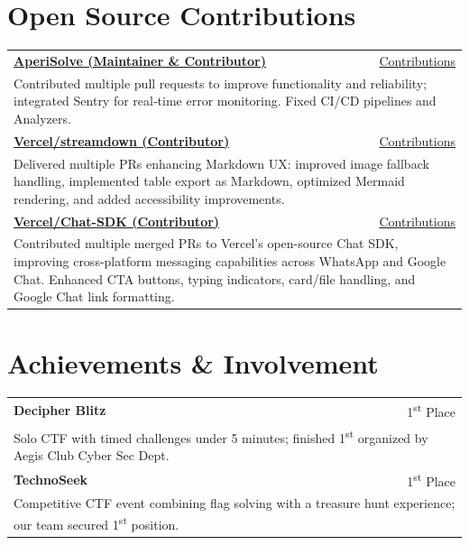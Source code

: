 \documentclass[letterpaper,11pt]{article}
\begin{document}
\section*{Open Source Contributions}
\begin{tabularx}{\textwidth}{X r}

\textbf{\href{https://github.com/Zeecka/AperiSolve}{AperiSolve (Maintainer \& Contributor)}} & \href{https://github.com/Zeecka/AperiSolve/issues?q=is\%3Apr\%20state\%3Aclosed\%20author\%3Aaradhyacp}{Contributions} \\
\multicolumn{2}{X}{Contributed multiple pull requests to improve functionality and reliability; integrated Sentry for real‑time error monitoring. Fixed CI/CD pipelines and Analyzers.} \\[0.7ex]

\textbf{\href{https://github.com/vercel/streamdown}{Vercel/streamdown (Contributor)}} & 
\href{https://github.com/vercel/streamdown/issues?q=is\%3Apr\%20author\%3Aaradhyacp}{Contributions} \\
\multicolumn{2}{X}{Delivered multiple PRs enhancing Markdown UX: improved image fallback handling, implemented table export as Markdown, optimized Mermaid rendering, and added accessibility improvements.} \\[0.7ex]

\textbf{\href{https://github.com/vercel/chat}{Vercel/Chat-SDK (Contributor)}} &
\href{https://github.com/vercel/chat/issues?q=is\%3Apr\%20author\%3Aaradhyacp}{Contributions} \\
\multicolumn{2}{X}{Contributed multiple merged PRs to Vercel's open-source Chat SDK, improving cross-platform messaging capabilities across WhatsApp and Google Chat. Enhanced CTA buttons, typing indicators, card/file handling, and Google Chat link formatting.} \\[0.7ex]
\end{tabularx}

\section*{Achievements \& Involvement}
\begin{tabularx}{\textwidth}{X r}  %
\textbf{Decipher Blitz} & 1\textsuperscript{st} Place \\
\multicolumn{2}{X}{Solo CTF with timed challenges under 5 minutes; finished 1\textsuperscript{st} organized by Aegis Club Cyber Sec Dept.} \\[0.7ex]
\textbf{TechnoSeek} & 1\textsuperscript{st} Place \\
\multicolumn{2}{X}{Competitive CTF event combining flag solving with a treasure hunt experience; our team secured 1\textsuperscript{st} position.} \\[0.7ex]
\end{tabularx}
\end{document}
